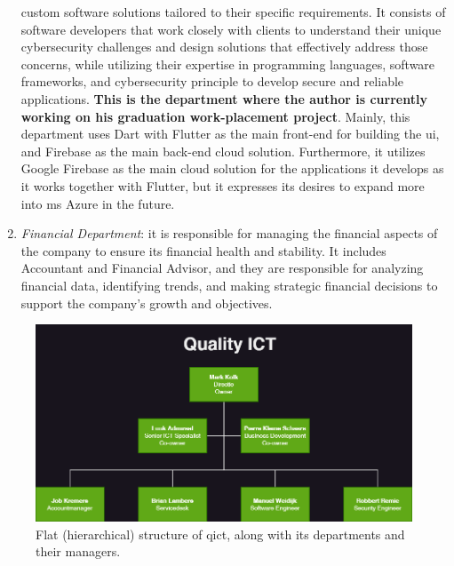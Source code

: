 \begin{enumerate}
            custom software solutions tailored to their specific requirements. It consists of software
            developers that work closely with clients to understand their unique cybersecurity challenges and
            design solutions that effectively address those concerns, while utilizing their expertise in
            programming languages, software frameworks, and cybersecurity principle to develop secure and
            reliable applications.
            \textbf{This is the department where the author is currently working on his graduation work-placement
                  project}. Mainly, this department uses Dart with Flutter as the main front-end for building the \acrshort{ui},
            and Firebase as the main back-end cloud solution. Furthermore, it utilizes Google Firebase as the  main cloud solution
            for the applications it develops as it works together with Flutter, but it expresses its desires to expand more into
            \acrshort{ms} Azure in the future.
      \item \textit{Financial Department}: it is responsible for managing the financial aspects of the company
            to ensure its financial health and stability. It includes Accountant and Financial Advisor, and
            they are responsible for analyzing financial data, identifying trends, and making strategic
            financial decisions to support the company's growth and objectives.
\end{enumerate}

\begin{figure}[H]
      \centering
      \includegraphics[width=1.0\textwidth]{Figures/OrganizationalDiagram_QICT.png}
      \caption{Flat (hierarchical) structure of \acrshort{qict}, along with its departments and their managers.}
\end{figure}

